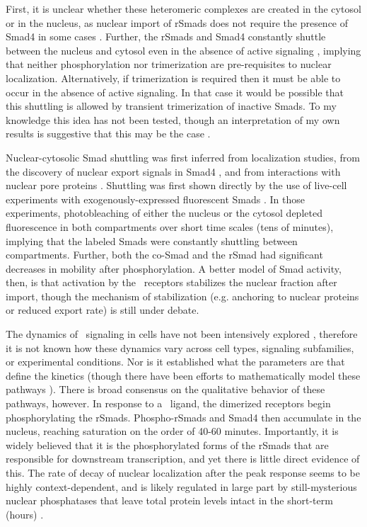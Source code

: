 First, it is unclear whether these
heteromeric complexes are created in the cytosol or in the nucleus,
as nuclear import of rSmads
does not require the presence of Smad4 in some cases \cite{Derynck2003}.
Further,
the rSmads and Smad4 constantly shuttle between the nucleus and cytosol
even in the absence of active signaling \cite{Nicolas2004}, 
implying that neither phosphorylation nor trimerization
are pre-requisites to nuclear localization.
Alternatively, if trimerization is required then it must be able to occur
in the absence of active signaling. In that case
it would be possible that this shuttling is allowed by transient trimerization of
inactive Smads. To my knowledge this idea has not been tested, though
an interpretation of my own results is suggestive that this may be the case .


Nuclear-cytosolic Smad shuttling was first inferred from localization
studies, from the discovery of nuclear export signals in Smad4
\cite{Pierreux2000,Watanabe2000}, and from interactions with nuclear pore
proteins \cite{Xu2002}. Shuttling was first shown directly
by the use of live-cell
experiments with exogenously-expressed fluorescent Smads \cite{Nicolas2004}.
In those experiments, photobleaching of either the nucleus
or the cytosol depleted fluorescence in both compartments over short time scales
(tens of minutes), implying that the labeled Smads were constantly
shuttling between compartments. Further, both the co-Smad and the rSmad
had significant decreases
in mobility after phosphorylation. A better model of
Smad activity, then, is that activation by the \tgfbsf\ receptors
stabilizes the nuclear fraction after import, though the mechanism
of stabilization (e.g. anchoring to nuclear proteins or reduced export rate)
is still under debate.


The dynamics of \tgfbsf\ signaling in cells have not been intensively
explored \cite{Warmflash2012}, therefore it is not known how these
dynamics vary across cell types, signaling subfamilies, or experimental conditions.
Nor is it established what the parameters are that define the kinetics (though there
have been efforts to mathematically model these pathways
\cite{Clarke2006,Umulis2009}).
There is broad consensus on the qualitative behavior of these pathways,
however. In response to a \tgfbsf\ ligand, the dimerized receptors begin
phosphorylating the rSmads. Phospho-rSmads and Smad4 then accumulate
in the nucleus, reaching saturation on the order of 40-60 minutes. 
Importantly, it is widely believed that it is the phosphorylated forms
of the rSmads that are responsible for downstream transcription, and yet
there is little direct evidence of this. The rate
of decay of nuclear localization after the peak response
seems to be highly context-dependent,
and is likely regulated in large part
by still-mysterious nuclear phosphatases that leave total protein levels
intact in the short-term (hours) \cite{Massague2012}.


